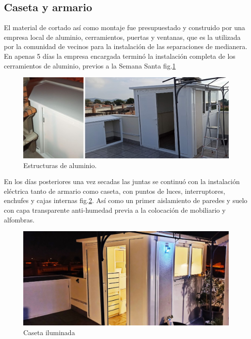 \subsection{Caseta y armario}

El material de cortado así como montaje fue presupuestado y construido por una empresa local de aluminio, cerramientos, puertas y ventanas, que es la utilizada por la comunidad de vecinos para la instalación de las separaciones de medianera. En apenas 5 días la empresa encargada terminó la instalación completa de los cerramientos de aluminio, previos a la Semana Santa fig.\ref{F:estructuras_aluminio}
\begin{figure}[htb]
\begin{center}
\includegraphics[width=1\textwidth]{./figuras/estructuras_aluminio.jpg}
\caption{Estructuras de aluminio.}
\label{F:estructuras_aluminio}
\end{center}
\end{figure}
En los días posteriores una vez secadas las juntas se continuó con la instalación eléctrica  tanto de armario como caseta, con puntos de luces, interruptores, enchufes y cajas internas fig.\ref{F:caseta_con_iluminacion_y_mobiliario}.
Así como un primer aislamiento de paredes y suelo con capa transparente anti-humedad previa a la colocación de mobiliario y alfombras.
\begin{figure}[htb]
\begin{center}
\includegraphics[width=1\textwidth]{./figuras/caseta_con_iluminacion_y_mobiliario.jpg}
\caption{Caseta iluminada}
\label{F:caseta_con_iluminacion_y_mobiliario}
\end{center}
\end{figure}
